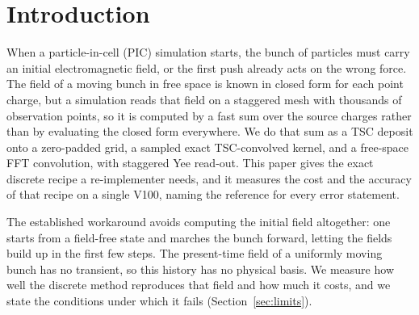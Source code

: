 \section{Introduction}
\label{sec:intro}

When a particle-in-cell (PIC) simulation starts, the bunch of particles must
carry an initial electromagnetic field, or the first push already acts on the
wrong force. The field of a moving bunch in free space is known in closed form
for each point charge, but a simulation reads that field on a staggered mesh
with thousands of observation points, so it is computed by a fast sum over the
source charges rather than by evaluating the closed form everywhere. We do that
sum as a TSC deposit onto a zero-padded grid, a sampled exact TSC-convolved
kernel, and a free-space FFT convolution, with staggered Yee read-out. This
paper gives the exact discrete recipe a re-implementer needs, and it measures
the cost and the accuracy of that recipe on a single V100, naming the reference
for every error statement.

The established workaround avoids computing the initial field altogether: one
starts from a field-free state and marches the bunch forward, letting the
fields build up in the first few steps. The present-time field of a uniformly
moving bunch has no transient, so this history has no physical basis. We
measure how well the discrete method reproduces that field and how much it
costs, and we state the conditions under which it fails
(Section~\ref{sec:limits}).

